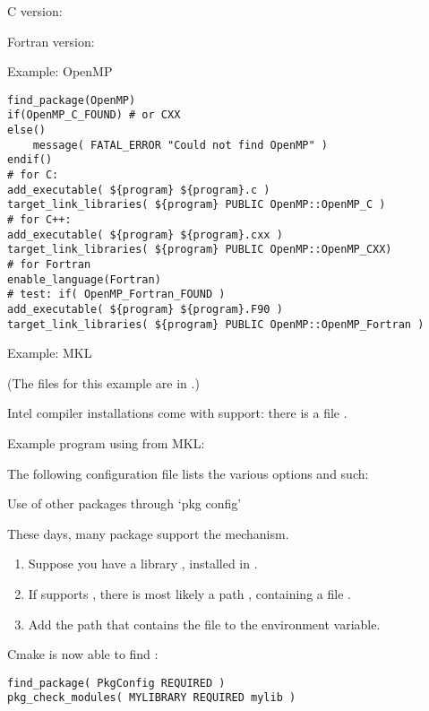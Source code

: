 C version:
%


Fortran version:
%



 {Example: OpenMP}

\begin{lstlisting}
find_package(OpenMP)
if(OpenMP_C_FOUND) # or CXX
else()
	message( FATAL_ERROR "Could not find OpenMP" )
endif()
# for C:
add_executable( ${program} ${program}.c )
target_link_libraries( ${program} PUBLIC OpenMP::OpenMP_C )
# for C++:
add_executable( ${program} ${program}.cxx )
target_link_libraries( ${program} PUBLIC OpenMP::OpenMP_CXX)
# for Fortran
enable_language(Fortran)
# test: if( OpenMP_Fortran_FOUND )
add_executable( ${program} ${program}.F90 )
target_link_libraries( ${program} PUBLIC OpenMP::OpenMP_Fortran )
\end{lstlisting}


 {Example: MKL}

(The files for this example are in .)

Intel compiler installations come with  support:
there is a file .

Example program using  from MKL:


The following configuration file lists the various options and such:
%



 {Use of other packages through `pkg config'}

These days, many package support the  mechanism.
\begin{enumerate}
\item Suppose you have a library , installed in .
\item If  supports , there is most likely a path
  , containing a file .
\item Add the path that contains the  file to the
   environment variable.
\end{enumerate}
Cmake is now able to find :
\begin{lstlisting}
find_package( PkgConfig REQUIRED )
pkg_check_modules( MYLIBRARY REQUIRED mylib )
\end{lstlisting}

